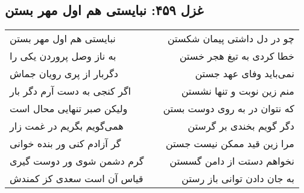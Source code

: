 \begin{center}
\section*{غزل ۴۵۹: نبایستی هم اول مهر بستن}
\label{sec:459}
\begin{longtable}{l p{0.5cm} r}
نبایستی هم اول مهر بستن
&&
چو در دل داشتی پیمان شکستن
\\
به ناز وصل پروردن یکی را
&&
خطا کردی به تیغ هجر خستن
\\
دگربار از پری رویان جماش
&&
نمی‌باید وفای عهد جستن
\\
اگر کنجی به دست آرم دگر بار
&&
منم زین نوبت و تنها نشستن
\\
ولیکن صبر تنهایی محال است
&&
که نتوان در به روی دوست بستن
\\
همی‌گویم بگریم در غمت زار
&&
دگر گویم بخندی بر گرستن
\\
گر آزادم کنی ور بنده خوانی
&&
مرا زین قید ممکن نیست جستن
\\
گرم دشمن شوی ور دوست گیری
&&
نخواهم دستت از دامن گسستن
\\
قیاس آن است سعدی کز کمندش
&&
به جان دادن توانی باز رستن
\\
\end{longtable}
\end{center}
